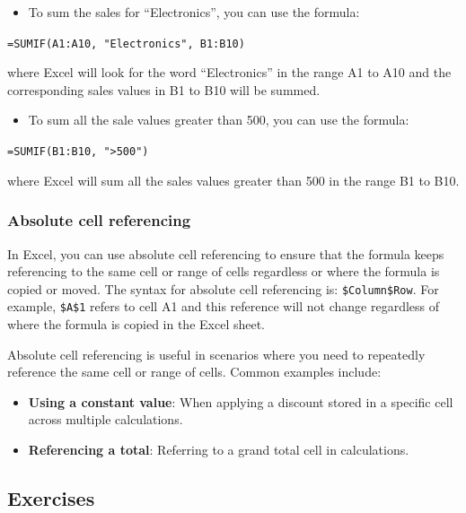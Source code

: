 \documentclass[
]{book}
\providecommand{\tightlist}{%
  \setlength{\itemsep}{0pt}\setlength{\parskip}{0pt}}
\begin{document}
\begin{itemize}
\tightlist
\item
  To sum the sales for ``Electronics'', you can use the formula:
\end{itemize}

\texttt{=SUMIF(A1:A10,\ "Electronics",\ B1:B10)}

where Excel will look for the word ``Electronics'' in the range A1 to A10 and the corresponding sales values in B1 to B10 will be summed.

\begin{itemize}
\tightlist
\item
  To sum all the sale values greater than 500, you can use the formula:
\end{itemize}

\texttt{=SUMIF(B1:B10,\ "\textgreater{}500")}

where Excel will sum all the sales values greater than 500 in the range B1 to B10.

\subsubsection*{Absolute cell referencing}\label{absolute-cell-referencing}

In Excel, you can use absolute cell referencing to ensure that the formula keeps referencing to the same cell or range of cells regardless or where the formula is copied or moved. The syntax for absolute cell referencing is: \texttt{\$Column\$Row}. For example, \texttt{\$A\$1} refers to cell A1 and this reference will not change regardless of where the formula is copied in the Excel sheet.

Absolute cell referencing is useful in scenarios where you need to repeatedly reference the same cell or range of cells. Common examples include:

\begin{itemize}
\item
  \textbf{Using a constant value}: When applying a discount stored in a specific cell across multiple calculations.
\item
  \textbf{Referencing a total}: Referring to a grand total cell in calculations.
\end{itemize}

\subsection{Exercises}\label{exercises-1}
\end{document}
